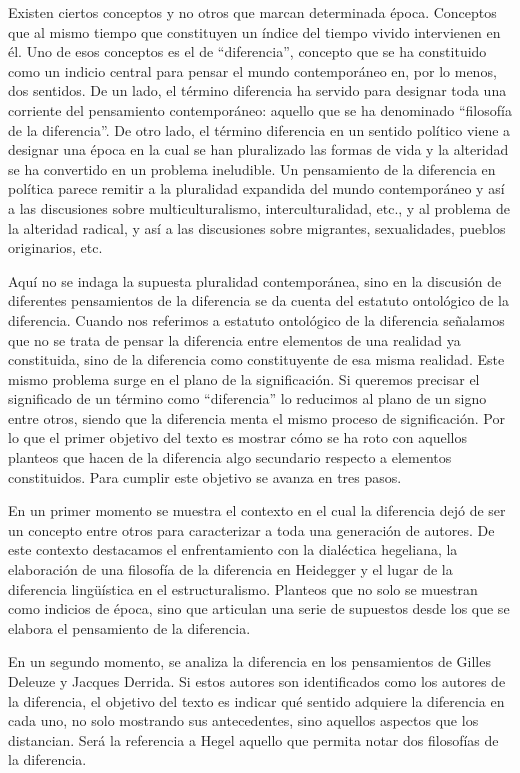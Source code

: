 \documentclass{book}
\begin{document}
Existen ciertos conceptos y no otros que marcan determinada época.
Conceptos que al mismo tiempo que constituyen un índice del tiempo
vivido intervienen en él. Uno de esos conceptos es el de \enquote{diferencia},
concepto que se ha constituido como un indicio central para pensar el
mundo contemporáneo en, por lo menos, dos sentidos. De un lado, el
término diferencia ha servido para designar toda una corriente del
pensamiento contemporáneo: aquello que se ha denominado \enquote{filosofía de la
diferencia}. De otro lado, el término diferencia en un sentido político
viene a designar una época en la cual se han pluralizado las formas de
vida y la alteridad se ha convertido en un problema ineludible. Un
pensamiento de la diferencia en política parece remitir a la pluralidad
expandida del mundo contemporáneo y así a las discusiones sobre
multiculturalismo, interculturalidad, etc., y al problema de la
alteridad radical, y así a las discusiones sobre migrantes,
sexualidades, pueblos originarios, etc.

Aquí no se indaga la supuesta pluralidad contemporánea, sino en la
discusión de diferentes pensamientos de la diferencia se da cuenta del
estatuto ontológico de la diferencia. Cuando nos referimos a estatuto
ontológico de la diferencia señalamos que no se trata de pensar la
diferencia entre elementos de una realidad ya constituida, sino de la
diferencia como constituyente de esa misma realidad. Este mismo problema
surge en el plano de la significación. Si queremos precisar el
significado de un término como \enquote{diferencia} lo reducimos al plano de un
signo entre otros, siendo que la diferencia menta el mismo proceso de
significación. Por lo que el primer objetivo del texto es mostrar cómo
se ha roto con aquellos planteos que hacen de la diferencia algo
secundario respecto a elementos constituidos. Para cumplir este objetivo
se avanza en tres pasos.

En un primer momento se muestra el contexto en el cual la diferencia
dejó de ser un concepto entre otros para caracterizar a toda una
generación de autores. De este contexto destacamos el enfrentamiento con
la dialéctica hegeliana, la elaboración de una filosofía de la
diferencia en Heidegger y el lugar de la diferencia lingüística en el
estructuralismo. Planteos que no solo se muestran como indicios de
época, sino que articulan una serie de supuestos desde los que se
elabora el pensamiento de la diferencia.

En un segundo momento, se analiza la diferencia en los pensamientos de
Gilles Deleuze y Jacques Derrida. Si estos autores son identificados
como los autores de la diferencia, el objetivo del texto es indicar qué
sentido adquiere la diferencia en cada uno, no solo mostrando sus
antecedentes, sino aquellos aspectos que los distancian. Será la
referencia a Hegel aquello que permita notar dos filosofías de la
diferencia.
\end{document}
